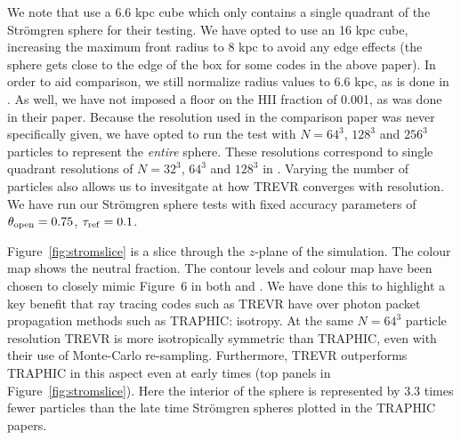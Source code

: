 \documentclass[fleq,usenatbib]{mnras}
\newcommand{\acro}{TREVR}
\newcommand{\tO}{\theta_{\rm open}}
\newcommand{\strom}{Str\"omgren}
\begin{document}
{We note that \cite{ilievEt06} use a 6.6 kpc cube which only contains a single
quadrant of the \strom{} sphere for their testing. We have opted to use an 16 
kpc cube, increasing the maximum front radius to 8 kpc to avoid any edge 
effects (the sphere gets close to the edge of the box for some codes in 
the above paper). In order to aid comparison, we still normalize radius values 
to 6.6 kpc, as is done in \cite{ilievEt06}. As well, we have not imposed a 
floor on the HII fraction of 0.001, as was done in their paper. Because the 
resolution used in the \cite{ilievEt06} comparison paper was never 
specifically given, we have opted to run the test with $N = 64^3$, $128^3$ and 
$256^3$ particles to represent the \textit{entire} sphere. These resolutions 
correspond to single quadrant resolutions of $N=32^3$, $64^3$ and $128^3$ in 
\cite{ilievEt06}. Varying the number of particles also allows us to invesitgate
at how \acro{} converges with resolution. We have run our \strom{} sphere 
tests with fixed accuracy parameters of $\tO = 0.75$, 
$\tau_{\rm ref} = 0.1$.

Figure~\ref{fig:stromslice} is a slice through the $z$-plane of the 
simulation. The colour map shows the neutral fraction. The contour 
levels and colour map have been chosen to closely mimic Figure~6 in both 
\cite{pawlikSchaye08} and \cite{pawlikSchaye11}. We have done this to 
highlight a key benefit that ray tracing codes such as \acro{} have over 
photon packet propagation methods such as TRAPHIC: isotropy. At the same 
$N=64^3$ particle resolution \acro{} is more isotropically symmetric than 
TRAPHIC, even with their use of Monte-Carlo re-sampling. Furthermore, \acro{} 
outperforms TRAPHIC in this aspect even at early times (top panels in 
Figure~\ref{fig:stromslice}). Here the interior of the sphere is represented 
by 3.3 times fewer particles than the late time \strom{} spheres plotted in 
the TRAPHIC papers.

}
\end{document}
